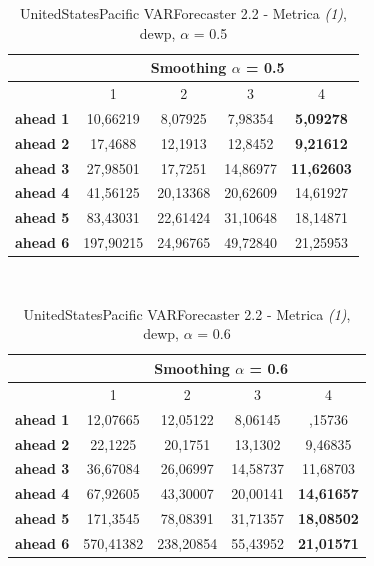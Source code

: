 \documentclass[12pt,a4paper,oneside,openright]{book}
\begin{document}
\begin{table}[H]
\centering
\begin{tabular}{|c|c|c|c|c|}
\hline
 & \multicolumn{4}{|c|}{Smoothing $\alpha$ = 0.5} \\
\hline
& 1 & 2 & 3 & 4 \\
\hline
\textbf{ahead 1} & 10,66219 & 8,07925 & 7,98354 & \textbf{5,09278} \\
\hline
\textbf{ahead 2} & 17,4688 & 12,1913 & 12,8452 & \textbf{9,21612}\\ 
\hline
\textbf{ahead 3} & 27,98501 & 17,7251 & 14,86977 & \textbf{11,62603}\\
\hline
\textbf{ahead 4} & 41,56125 & 20,13368 & 20,62609 & 14,61927\\ 
\hline
\textbf{ahead 5} & 83,43031 & 22,61424 & 31,10648 & 18,14871\\
\hline
\textbf{ahead 6} & 197,90215 & 24,96765 & 49,72840 & 21,25953\\ 
\hline
\end{tabular} \\
\caption{UnitedStatesPacific VARForecaster 2.2 - Metrica \textit{(1)}, dewp, $\alpha$ = 0.5}
\end{table} 

\medskip

\begin{table}[H]
\centering
\begin{tabular}{|c|c|c|c|c|}
\hline
 & \multicolumn{4}{|c|}{Smoothing $\alpha$ = 0.6} \\
\hline
& 1 & 2 & 3 & 4 \\
\hline
\textbf{ahead 1} & 12,07665 & 12,05122 & 8,06145 & ,15736 \\
\hline
\textbf{ahead 2} & 22,1225 & 20,1751 & 13,1302 & 9,46835 \\ 
\hline
\textbf{ahead 3} & 36,67084 & 26,06997 & 14,58737 & 11,68703\\
\hline
\textbf{ahead 4} & 67,92605 & 43,30007 & 20,00141 & \textbf{14,61657}\\ 
\hline
\textbf{ahead 5} & 171,3545 & 78,08391 & 31,71357 & \textbf{18,08502}\\
\hline
\textbf{ahead 6} & 570,41382 & 238,20854 & 55,43952 & \textbf{21,01571}\\ 
\hline
\end{tabular} \\
\caption{UnitedStatesPacific VARForecaster 2.2 - Metrica \textit{(1)}, dewp, $\alpha$ = 0.6}
\end{table} 
\end{document}
